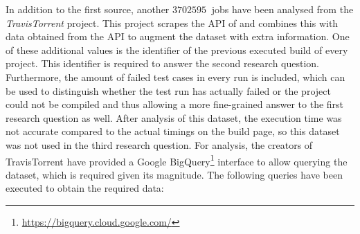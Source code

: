 \noindent In addition to the first source, another $\SI{3702595}{}$ jobs have been analysed from the \emph{TravisTorrent} project. This project \cite{msr17challenge} scrapes the API of \travisci{} and combines this with data obtained from the \github{} API to augment the dataset with extra information. One of these additional values is the identifier of the previous executed build of every project. This identifier is required to answer the second research question. Furthermore, the amount of failed test cases in every run is included, which can be used to distinguish whether the test run has actually failed or the project could not be compiled and thus allowing a more fine-grained answer to the first research question as well. After analysis of this dataset, the execution time was not accurate compared to the actual timings on the \travisci{} build page, so this dataset was not used in the third research question. For analysis, the creators of TravisTorrent have provided a Google BigQuery\footnote{\url{https://bigquery.cloud.google.com/}} interface to allow querying the dataset, which is required given its magnitude. The following queries have been executed to obtain the required data:



